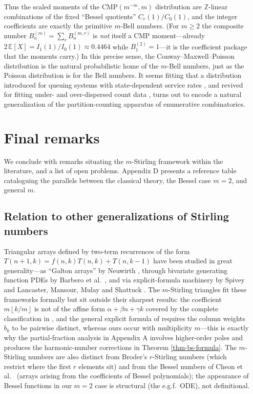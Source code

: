 \documentclass[a4paper]{amsart}
\numberwithin{equation}{section}
\newcommand{\floor}[1]{\left\lfloor #1 \right\rfloor}
\begin{document}
Thus the scaled moments of the $\mathrm{CMP}(m^{-m}, m)$ distribution are $\mathbb{Z}$-linear combinations of the fixed ``Bessel quotients'' $C_r(1)/C_0(1)$, and the integer coefficients are exactly the primitive $m$-Bell numbers. (For $m \geq 2$ the composite number $B^{(m)}_n = \sum_r B^{(m,r)}_n$ is \emph{not} itself a CMP moment---already $2\,\mathbb{E}[X] = I_1(1)/I_0(1) \approx 0.4464$ while $B^{(2)}_1 = 1$---it is the coefficient package that the moments carry.) In this precise sense, the Conway--Maxwell--Poisson distribution is the natural probabilistic home of the $m$-Bell numbers, just as the Poisson distribution is for the Bell numbers. It seems fitting that a distribution introduced for queuing systems with state-dependent service rates \cite{conwayMaxwell1962}, and revived for fitting under- and over-dispersed count data \cite{shmueliUsefulDistributionFitting2005}, turns out to encode a natural generalization of the partition-counting apparatus of enumerative combinatorics.

\section{Final remarks}\label{sec-final-remarks}

\noindent We conclude with remarks situating the $m$-Stirling framework within the literature, and a list of open problems. Appendix D presents a reference table cataloguing the parallels between the classical theory, the Bessel case $m = 2$, and general $m$.

\subsection{Relation to other generalizations of Stirling numbers}
Triangular arrays defined by two-term recurrences of the form $T(n+1,k) = f(n,k)T(n,k) + T(n,k-1)$ have been studied in great generality---as ``Galton arrays'' by Neuwirth \cite{neuwirth_recursively_2001}, through bivariate generating function PDEs by Barbero et al.\ \cite{barbero_g_bivariate_2014}, and via explicit-formula machinery by Spivey \cite{spiveySolutionsGeneralCombinatorial2011} and Lancaster, Mansour, Mulay and Shattuck \cite{mansour_general_2012}. The $m$-Stirling triangles fit these frameworks formally but sit outside their sharpest results: the coefficient $m\floor{k/m}$ is not of the affine form $\alpha + \beta n + \gamma k$ covered by the complete classification in \cite{barbero_g_bivariate_2014}, and the general explicit formula of \cite{mansour_general_2012} requires the column weights $b_k$ to be pairwise distinct, whereas ours occur with multiplicity $m$---this is exactly why the partial-fraction analysis in Appendix A involves higher-order poles and produces the harmonic-number corrections in Theorem \ref{thm-bs-formula}. The $m$-Stirling numbers are also distinct from Broder's $r$-Stirling numbers \cite{broder1984} (which restrict where the first $r$ elements sit) and from the Bessel numbers of Cheon et al.\ \cite{cheonGeneralizedBesselNumbers2013a} (arrays arising from the coefficients of Bessel polynomials); the appearance of Bessel functions in our $m = 2$ case is structural (the e.g.f.\ ODE), not definitional.
\end{document}
